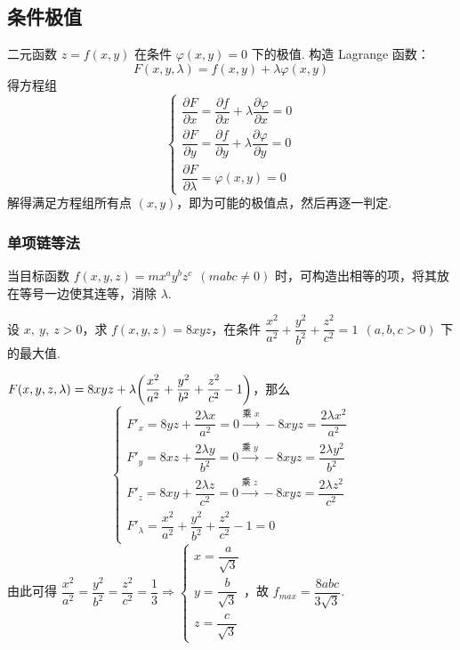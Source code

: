\subsection{条件极值}

二元函数 $ z=f(x, y) $ 在条件 $ \varphi(x, y)=0 $ 下的极值.
构造 Lagrange 函数：
$$F(x, y, \lambda)=f(x, y)+\lambda \varphi(x, y)$$
得方程组
$$\begin{cases}
    \dfrac{\partial F}{\partial x}=\dfrac{\partial f}{\partial x}+\lambda \dfrac{\partial \varphi}{\partial x}=0 \\[6pt]
\dfrac{\partial F}{\partial y}=\dfrac{\partial f}{\partial y}+\lambda \dfrac{\partial \varphi}{\partial y}=0 \\[6pt]
\dfrac{\partial F}{\partial \lambda}=\varphi(x, y)=0
\end{cases}$$
解得满足方程组所有点 $ (x, y) $，即为可能的极值点，然后再逐一判定.

\subsubsection{单项链等法}

当目标函数 $f(x,y,z)=mx^ay^bz^c~~(mabc\neq0)$ 时，可构造出相等的项，将其放在等号一边使其连等，消除 $\lambda$.

\begin{example}
    设 $x,~y,~z>0$，求 $f(x,y,z)=8xyz$，在条件 $\dfrac{x^2}{a^2}+\dfrac{y^2}{b^2}+\dfrac{z^2}{c^2}=1~~(a,b,c>0)$ 下的最大值.
\end{example}
\begin{solution}
    $F(x,y,z,\lambda)=8xyz+\lambda\qty(\dfrac{x^2}{a^2}+\dfrac{y^2}{b^2}+\dfrac{z^2}{c^2}-1)$，那么 
    $$\begin{cases}
        F'_x=8 y z + \dfrac{2 \lambda x}{a^{2}}=0 \xrightarrow{\text{乘 }x} -8xyz=\dfrac{2\lambda x^2}{a^2}\\
        F'_y=8 x z + \dfrac{2 \lambda y}{b^{2}}=0 \xrightarrow{\text{乘 }y} -8xyz=\dfrac{2\lambda y^2}{b^2}\\
        F'_z=8 x y + \dfrac{2 \lambda z}{c^{2}}=0 \xrightarrow{\text{乘 }z} -8xyz=\dfrac{2\lambda z^2}{c^2}\\
        F'_\lambda=\dfrac{x^{2}}{a^{2}}+ \dfrac{y^{2}}{b^{2}} +\dfrac{z^{2}}{c^{2}}  -1=0
    \end{cases}$$
    由此可得 $\dfrac{x^2}{a^2}=\dfrac{y^2}{b^2}=\dfrac{z^2}{c^2}=\dfrac{1}{3}\Rightarrow\begin{cases}
        x=\dfrac{a}{\sqrt{3}}\\ y=\dfrac{b}{\sqrt{3}}\\ z=\dfrac{c}{\sqrt{3}} 
    \end{cases}$，故 $f_{max}=\dfrac{8abc}{3\sqrt{3}}.$
\end{solution}

